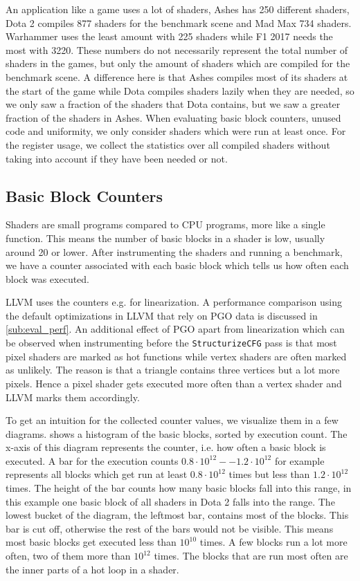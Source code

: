 An application like a game uses a lot of shaders, Ashes has 250 different shaders, Dota 2 compiles 877 shaders for the benchmark scene and Mad Max 734 shaders.
Warhammer uses the least amount with 225 shaders while F1 2017 needs the most with 3220.
These numbers do not necessarily represent the total number of shaders in the games, but only the amount of shaders which are compiled for the benchmark scene.
A difference here is that Ashes compiles most of its shaders at the start of the game while Dota compiles shaders lazily when they are needed, so we only saw a fraction of the shaders that Dota contains, but we saw a greater fraction of the shaders in Ashes.
When evaluating basic block counters, unused code and uniformity, we only consider shaders which were run at least once.
For the register usage, we collect the statistics over all compiled shaders without taking into account if they have been needed or not.

\subsection{Basic Block Counters}
\label{sub:eval_counters}
Shaders are small programs compared to CPU programs, more like a single function.
This means the number of basic blocks in a shader is low, usually around 20 or lower.
After instrumenting the shaders and running a benchmark, we have a counter associated with each basic block which tells us how often each block was executed.

LLVM uses the counters e.g. for linearization. A performance comparison using the default optimizations in LLVM that rely on PGO data is discussed in \cref{sub:eval_perf}.
An additional effect of PGO apart from linearization which can be observed when instrumenting before the \texttt{StructurizeCFG} pass is that most pixel shaders are marked as hot functions while vertex shaders are often marked as unlikely.
The reason is that a triangle contains three vertices but a lot more pixels.
Hence a pixel shader gets executed more often than a vertex shader and LLVM marks them accordingly.

To get an intuition for the collected counter values, we visualize them in a few diagrams.
 shows a histogram of the basic blocks, sorted by execution count.
The x-axis of this diagram represents the counter, i.e. how often a basic block is executed.
A bar for the execution counts $0.8\cdot 10^{12}--1.2\cdot 10^{12}$ for example represents all blocks which get run at least $0.8\cdot 10^{12}$ times but less than $1.2\cdot 10^{12}$ times.
The height of the bar counts how many basic blocks fall into this range, in this example one basic block of all shaders in Dota 2 falls into the range.
The lowest bucket of the diagram, the leftmost bar, contains most of the blocks.
This bar is cut off, otherwise the rest of the bars would not be visible.
This means most basic blocks get executed less than $10^10$ times.
A few blocks run a lot more often, two of them more than $10^{12}$ times.
The blocks that are run most often are the inner parts of a hot loop in a shader.


